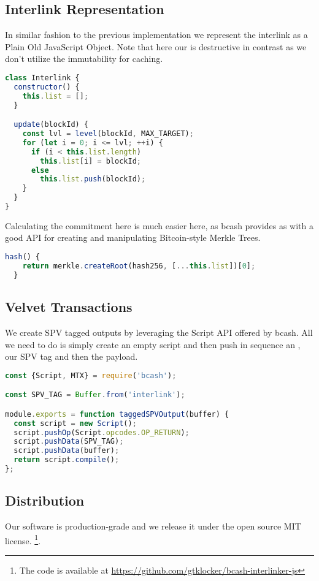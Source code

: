 \subsection{Interlink Representation}
In similar fashion to the previous implementation we represent the interlink as a Plain Old JavaScript Object. Note that here our  is destructive in contrast as we don't utilize the immutability for caching.

\begin{lstlisting}[language=js]
class Interlink {
  constructor() {
    this.list = [];
  }

  update(blockId) {
    const lvl = level(blockId, MAX_TARGET);
    for (let i = 0; i <= lvl; ++i) {
      if (i < this.list.length)
        this.list[i] = blockId;
      else
        this.list.push(blockId);
    }
  }
}
\end{lstlisting}

Calculating the commitment here is much easier here, as bcash provides as with a good API for creating and manipulating Bitcoin-style Merkle Trees.

\begin{lstlisting}[language=js]
  hash() {
    return merkle.createRoot(hash256, [...this.list])[0];
  }
\end{lstlisting}

\subsection{Velvet Transactions}
We create SPV tagged outputs by leveraging the Script API offered by bcash. All we need to do is simply create an empty script and then push in sequence an , our SPV tag and then the payload.

\begin{lstlisting}[language=js]
const {Script, MTX} = require('bcash');

const SPV_TAG = Buffer.from('interlink');

module.exports = function taggedSPVOutput(buffer) {
  const script = new Script();
  script.pushOp(Script.opcodes.OP_RETURN);
  script.pushData(SPV_TAG);
  script.pushData(buffer);
  return script.compile();
};
\end{lstlisting}

\subsection{Distribution}

Our software is production-grade and we release it under the open source MIT license.
\footnote{The code is available at \url{https://github.com/gtklocker/bcash-interlinker-js}}.

